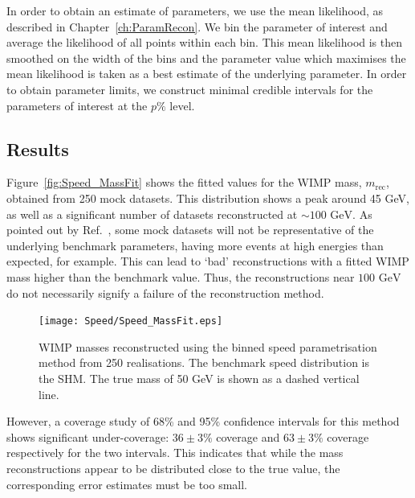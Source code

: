 In order to obtain an estimate of parameters, we use the mean likelihood, as described in Chapter~\ref{ch:ParamRecon}. We bin the parameter of interest and average the likelihood of all points within each bin. This mean likelihood is then smoothed on the width of the bins and the parameter value which maximises the mean likelihood is taken as a best estimate of the underlying parameter. In order to obtain parameter limits, we construct minimal credible intervals for the parameters of interest at the $p\%$ level. 

\subsection{Results}
Figure~\ref{fig:Speed_MassFit} shows the fitted values for the WIMP mass, \(m_\textrm{rec}\), obtained from 250 mock datasets. This distribution shows a peak around 45 GeV, as well as a significant number of datasets reconstructed at \(\sim 100 \textrm{ GeV}\). As pointed out by Ref.\ \cite{Strege:2012}, some mock datasets will not be representative of the underlying benchmark parameters, having more events at high energies than expected, for example. This can lead to `bad' reconstructions with a fitted WIMP mass higher than the benchmark value. Thus, the reconstructions near \(100 \textrm{ GeV}\) do not necessarily signify a failure of the reconstruction method.

 \begin{figure}[t]
\centering
  \texttt{[image: Speed/Speed\_MassFit.eps]}
  \caption[Distribution of reconstructed WIMP masses using the binned speed parametrisation]{WIMP masses reconstructed using the binned speed parametrisation method from 250 realisations. The benchmark speed distribution is the SHM. The true mass of 50 GeV is shown as a dashed vertical line.}
  \label{fig:Speed:Speed_MassFit}
\end{figure}

However, a coverage study of 68\% and 95\% confidence intervals for this method shows significant under-coverage: \(36 \pm 3 \%\) coverage and \(63 \pm 3 \%\) coverage respectively for the two intervals. This indicates that while the mass reconstructions appear to be distributed close to the true value, the corresponding error estimates must be too small. 

